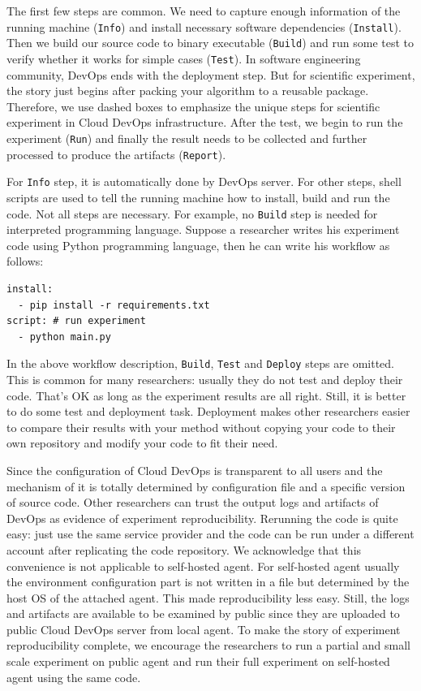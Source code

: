 \documentclass[10pt, conference, compsocconf]{IEEEtran}
\begin{document}
The first few steps are common. We need to capture enough information of the running machine (\texttt{Info}) and install necessary software dependencies (\texttt{Install}). Then we build our source code to binary executable (\texttt{Build}) and run some test to verify whether it works for simple cases (\texttt{Test}). In software engineering community, DevOps ends with the deployment step. But for scientific experiment, the story just begins after packing your algorithm to a reusable package. Therefore, we use dashed boxes to emphasize the unique steps for scientific experiment in Cloud DevOps infrastructure. After the test, we begin to run the experiment (\texttt{Run}) and finally the result needs to be collected and further processed to produce the artifacts (\texttt{Report}).

For \texttt{Info} step, it is automatically done by DevOps server. For other steps, shell scripts are used to tell the running machine how to install, build and run the code. Not all steps are necessary. For example, no \texttt{Build} step is needed for interpreted programming language. Suppose a researcher writes his experiment code using Python programming language, then he can write his workflow as follows:
\begin{lstlisting}[caption={workflow description}, label={lst:wd}, basicstyle={\small}]
install: 
  - pip install -r requirements.txt
script: # run experiment
  - python main.py
\end{lstlisting}

In the above workflow description, \texttt{Build}, \texttt{Test} and \texttt{Deploy} steps are omitted. This is common for many researchers: usually they do not test and deploy their code. That's OK as long as the experiment results are all right. Still, it is better to do some test and deployment task. Deployment makes other researchers easier to compare their results with your method without copying your code to their own repository and modify your code to fit their need.

Since the configuration of Cloud DevOps is transparent to all users and the mechanism of it is totally determined by configuration file and a specific version of source code. Other researchers can trust the output logs and artifacts of DevOps as evidence of experiment reproducibility. Rerunning the code is quite easy: just use the same service provider and the code can be run under a different account after replicating the code repository. We acknowledge that this convenience is not applicable to self-hosted agent. For self-hosted agent usually the environment configuration part is not written in a file but determined by the host OS of the attached agent. This made reproducibility less easy. Still, the logs and artifacts are available to be examined by public since they are uploaded to public Cloud DevOps server from local agent. To make the story of experiment reproducibility complete,
we encourage the researchers to run a partial and small scale experiment on public agent and run their full experiment on self-hosted agent using the same code.
\end{document}
